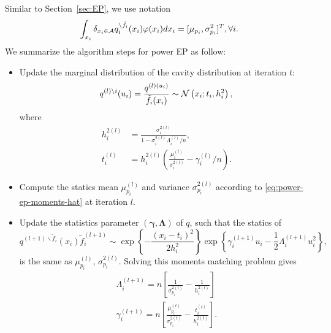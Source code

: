 \documentclass{article}
\begin{document}
Similar to Section~\ref{sec:EP}, we use notation
\begin{equation}\label{eq:power-ep-moments-hat}
  \int_{x_i} \delta_{x_i \in \mathcal{A}} q_i^{\backslash \tilde{f}_i}(x_i) \varphi(x_i) d x_i = [\mu_{p_i}, \sigma_{p_i}^2]^{T}, \forall i.
\end{equation}
We summarize the algorithm steps for power EP as follow:
\begin{itemize}
\item Update the marginal distribution of the cavity distribution at iteration $t$:
  \begin{equation}
    q^{(l)\backslash i}(u_i) = \frac{q^{(l)(u_i)}}{\tilde{f}_i(x_i)} \sim \mathcal{N}\left( x_i; t_i, h_i^2 \right),
  \end{equation}
  where
  \begin{align}
    h_i^{2 (l)} &= \frac{\sigma_i^{2 (l)}}{1-\sigma_i^{2 (l)} \Lambda_i^{(l)}/n}, \\
    t_i^{(l)} &= h_i^{2(l)}\left( \frac{\mu_i^{(l)}}{\sigma_i^{2(l)}} - {\gamma_i^{(l)}}/n \right).
  \end{align}
  
\item Compute the statics mean $\mu_{p_i}^{(l)}$ and variance $\sigma^{2(l)}_{p_i}$  according to \eqref{eq:power-ep-moments-hat} at iteration $l$.
  
\item Update the statistics parameter $\left( \bm{\gamma}, \bm{\Lambda} \right)$ of $q$, such that the statics of
  \begin{equation}
    q^{(l+1)\backslash \tilde{f}_{i}}(x_i) \tilde{f}_{i}^{(l+1)} \sim \exp\left\{ -\frac{(x_i - t_i)^2}{2h_i^2} \right\} \exp\left\{ \gamma_i^{(l+1)}u_i - \frac{1}{2}\Lambda_i^{(l+1)}u_i^2 \right\},
  \end{equation}
  is the same as $\mu_{p_i}^{(l)}$, $\sigma_{p_i}^{2(l)}$. Solving this moments matching problem gives
  \begin{align}
    \Lambda_i^{(l+1)} = n \left[  \frac{1}{\sigma_{p_i}^{2(l)}} - \frac{1}{h_i^{2(l)}} \right]\\
    \gamma_i^{(l+1)} = n \left[ \frac{\mu_{p_i}^{(t)}}{\sigma_{p_i}^{2(t)}} - \frac{t_i^{(t)}}{h_i^{2(t)}} \right].
  \end{align}
\end{itemize}
\end{document}
